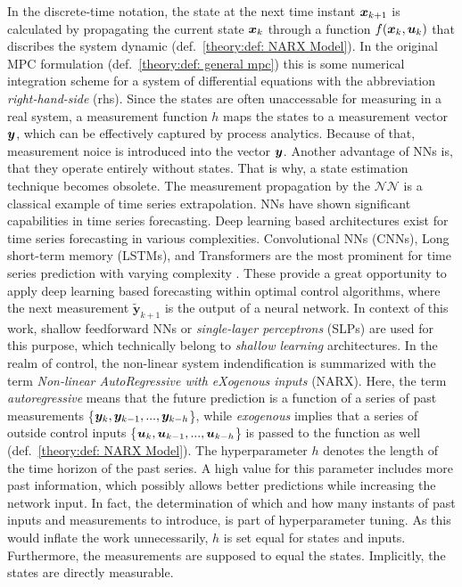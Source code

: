 \noindent
In the discrete-time notation, the state at the next time instant ${\bm{x}}_{k+1}$ is calculated by propagating the current
state ${\bm{x}}_k$ through a function $f({\bm{x}}_k, {\bm{u}}_k)$ that discribes the system dynamic (def.~\ref{theory:def: NARX Model}).
In the original MPC formulation (def.~\ref{theory:def: general mpc}) this is some numerical integration scheme for a system of differential equations \cite{biegler2010}
with the abbreviation \emph{right-hand-side} (rhs). Since the states are often unaccessable for measuring in a real system,
a measurement function $h$ maps the states to a measurement vector ${\bm{y}}$, which can be effectively captured by process analytics.
Because of that, measurement noice is introduced into the vector ${\bm{y}}$. Another advantage of NNs is, that they operate entirely 
without states. That is why, a state estimation technique becomes obsolete.
\newline
\newline
The measurement propagation by the $\mathcal{NN}$ is a classical example of time series extrapolation. NNs have shown significant
capabilities in time series forecasting. Deep learning based architectures exist for time series forecasting
in various complexities. Convolutional NNs (CNNs), Long short-term memory (LSTMs), and Transformers are the most prominent for
time series prediction with varying complexity \cite{benidis2022,vaswani2023}.
These provide a great opportunity to apply deep learning based forecasting within optimal control algorithms, where the next
measurement $\bm{\tilde{y}}_{k+1}$ is the output of a neural network.
In context of this work, shallow feedforward NNs or \emph{single-layer perceptrons} (SLPs) are used for this purpose, which
technically belong to \emph{shallow learning} architectures.
\newline
\newline
In the realm of control, the non-linear system indendification is summarized with the term
\emph{Non-linear AutoRegressive with eXogenous inputs} (NARX). Here, the term \emph{autoregressive} means that
the future prediction is a function of a series of past measurements \{${\bm{y}}_k, {\bm{y}}_{k-1}, ..., {\bm{y}}_{k-h}$\}, while \emph{exogenous}
implies that a series of outside control inputs \{${\bm{u}}_k, {\bm{u}}_{k-1}, ..., {\bm{u}}_{k-h}$\} is passed to the function as well (def.~\ref{theory:def: NARX Model}).
The hyperparameter $h$ denotes the length of the time horizon of the past series. A high value for this parameter includes more
past information, which possibly allows better predictions while increasing the network input.
In fact, the determination of which and how many instants of past inputs and measurements to introduce, is part
of hyperparameter tuning. As this would inflate the work unnecessarily, $h$ is set equal for states and inputs.
Furthermore, the measurements are supposed to equal the states. Implicitly, the states are directly measurable.

